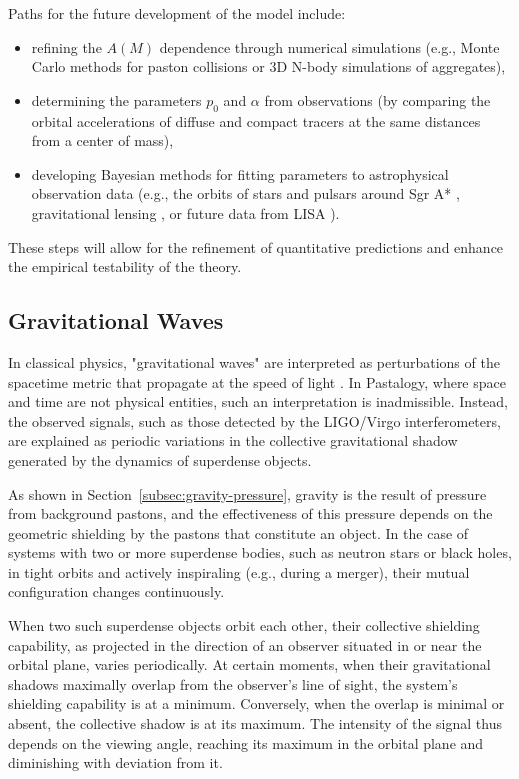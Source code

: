\documentclass[pdflatex,sn-mathphys-num,referee]{sn-jnl}
\begin{document}
Paths for the future development of the model include:
\begin{itemize}
    \item refining the \( A(M) \) dependence through numerical simulations \cite{newman2013-computational} (e.g., Monte Carlo methods for paston collisions or 3D N-body simulations of aggregates),
    \item determining the parameters \( p_0 \) and \( \alpha \) from observations (by comparing the orbital accelerations of diffuse and compact tracers at the same distances from a center of mass),
    \item developing Bayesian methods for fitting parameters to astrophysical observation data (e.g., the orbits of stars and pulsars around Sgr A* \cite{ghez2008-sgrA}, gravitational lensing \cite{schneider2006-lensing}, or future data from LISA \cite{lisa-consortium2017}).
\end{itemize}
These steps will allow for the refinement of quantitative predictions and enhance the empirical testability of the theory.

\subsection{Gravitational Waves}\label{subsec:gravitational-waves}

In classical physics, "gravitational waves" are interpreted as perturbations of the spacetime metric that propagate at the speed of light \cite{ligo2016-detection}. In Pastalogy, where space and time are not physical entities, such an interpretation is inadmissible. Instead, the observed signals, such as those detected by the LIGO/Virgo interferometers, are explained as periodic variations in the collective gravitational shadow generated by the dynamics of superdense objects.

As shown in Section~\ref{subsec:gravity-pressure}, gravity is the result of pressure from background pastons, and the effectiveness of this pressure depends on the geometric shielding by the pastons that constitute an object. In the case of systems with two or more superdense bodies, such as neutron stars or black holes, in tight orbits and actively inspiraling (e.g., during a merger), their mutual configuration changes continuously.

When two such superdense objects orbit each other, their collective shielding capability, as projected in the direction of an observer situated in or near the orbital plane, varies periodically. At certain moments, when their gravitational shadows maximally overlap from the observer's line of sight, the system's shielding capability is at a minimum. Conversely, when the overlap is minimal or absent, the collective shadow is at its maximum. The intensity of the signal thus depends on the viewing angle, reaching its maximum in the orbital plane and diminishing with deviation from it.
\end{document}
